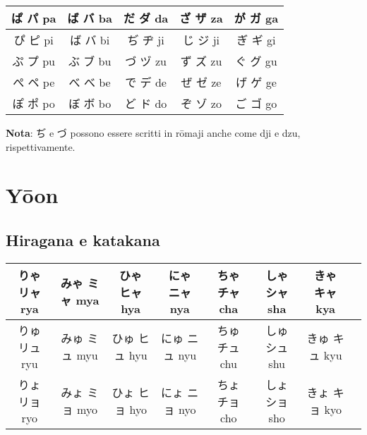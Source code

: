 \documentclass{article}
\begin{document}
        \begin{center}
            \begin{japanese}
                \begin{tabular}{|c|c|c|c|c|}
                    \hline
                    ぱ パ pa & ば バ ba & だ ダ da & ざ ザ za & が ガ ga\\
                    \hline
                    ぴ ピ pi & ば バ bi & ぢ ヂ ji & じ ジ ji & ぎ ギ gi\\
                    \hline
                    ぷ プ pu & ぶ ブ bu & づ ヅ zu & ず ズ zu & ぐ グ gu\\
                    \hline
                    ぺ ペ pe & べ べ be & で デ de & ぜ ゼ ze & げ ゲ ge\\
                    \hline
                    ぽ ポ po & ぼ ボ bo & ど ド do & ぞ ゾ zo & ご ゴ go\\
                    \hline
                \end{tabular}
            \end{japanese}
        \end{center}

        \textbf{Nota}: \textjapanese{ぢ} e \textjapanese{づ} possono essere scritti in rōmaji anche come \textjapanese{dji} e \textjapanese{dzu}, rispettivamente.

    \section{Y\={o}on}

        \subsection{Hiragana e katakana}

            \begin{center}
                \begin{japanese}
                    \begin{tabular}{|c|c|c|c|c|c|c|c|}
                        \hline
                        りゃ リャ rya & みゃ ミャ mya & ひゃ ヒャ hya & にゃ ニャ nya & ちゃ チャ cha & しゃ シャ sha & きゃ キャ kya\\
                        \hline
                        りゅ リュ ryu & みゅ ミュ myu & ひゅ ヒュ hyu & にゅ ニュ nyu & ちゅ チュ chu & しゅ シュ shu & きゅ キュ kyu\\
                        \hline
                        りょ リョ ryo & みょ ミョ myo & ひょ ヒョ hyo & にょ ニョ nyo & ちょ チョ cho & しょ ショ sho & きょ キョ kyo\\
                        \hline
                    \end{tabular}
                \end{japanese}
            \end{center}
\end{document}
